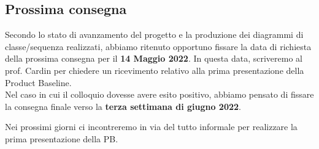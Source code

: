 \subsection{Prossima consegna}

Secondo lo stato di avanzamento del progetto e la produzione dei diagrammi di classe/sequenza realizzati, abbiamo ritenuto opportuno fissare la data di richiesta della prossima consegna per il \textbf{14 Maggio 2022}. In questa data, scriveremo al prof. Cardin per chiedere un ricevimento relativo alla prima presentazione della Product Baseline. \\

Nel caso in cui il colloquio dovesse avere esito positivo, abbiamo pensato di fissare la consegna finale verso la \textbf{terza settimana di giugno 2022}.

Nei prossimi giorni ci incontreremo in via del tutto informale per realizzare la prima presentazione della PB.


